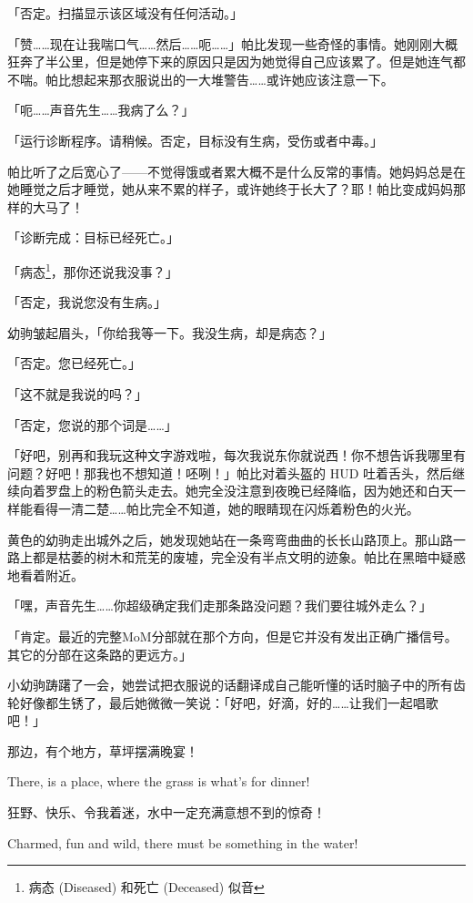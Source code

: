 「{\mt 否定。扫描显示该区域没有任何活动。}」

「赞……现在让我喘口气……然后……呃……」帕比发现一些奇怪的事情。她刚刚大概狂奔了半公里，但是她停下来的原因只是因为她觉得自己应该累了。但是她连气都不喘。帕比想起来那衣服说出的一大堆警告……或许她应该注意一下。

「呃……声音先生……我病了么？」

「{\mt 运行诊断程序。请稍候。否定，目标没有生病，受伤或者中毒。}」

帕比听了之后宽心了——不觉得饿或者累大概不是什么反常的事情。她妈妈总是在她睡觉之后才睡觉，她从来不累的样子，或许她终于长大了？耶！帕比变成妈妈那样的大马了！

「{\mt 诊断完成：目标已经死亡。}」

「病态\footnote{病态 (Diseased) 和死亡 (Deceased) 似音}，那你还说我没事？」

「{\mt 否定，我说您没有生病。}」

幼驹皱起眉头，「你给我等一下。我没生病，却是病态？」

「{\mt 否定。您已经死亡。}」

「这不就是我说的吗？」

「{\mt 否定，您说的那个词是……}」

「好吧，别再和我玩这种文字游戏啦，每次我说东你就说西！你不想告诉我哪里有问题？好吧！那我也不想知道！呸咧！」帕比对着头盔的 HUD 吐着舌头，然后继续向着罗盘上的粉色箭头走去。她完全没注意到夜晚已经降临，因为她还和白天一样能看得一清二楚……帕比完全不知道，她的眼睛现在闪烁着粉色的火光。

\horizonline


黄色的幼驹走出城外之后，她发现她站在一条弯弯曲曲的长长山路顶上。那山路一路上都是枯萎的树木和荒芜的废墟，完全没有半点文明的迹象。帕比在黑暗中疑惑地看着附近。

「嘿，声音先生……你超级确定我们走那条路没问题？我们要往城外走么？」

「{\mt 肯定。最近的完整MoM分部就在那个方向，但是它并没有发出正确广播信号。其它的分部在这条路的更远方。}」

小幼驹踌躇了一会，她尝试把衣服说的话翻译成自己能听懂的话时脑子中的所有齿轮好像都生锈了，最后她微微一笑说：「好吧，好滴，好的……让我们一起唱歌吧！」

\begin{song}
那边，有个地方，草坪摆满晚宴！

There, is a place, where the grass is what's for dinner!

\medskip

狂野、快乐、令我着迷，水中一定充满意想不到的惊奇！

Charmed, fun and wild, there must be something in the water!
\end{song}


